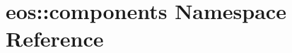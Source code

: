 \hypertarget{namespaceeos_1_1components}{
\section{eos::components Namespace Reference}
\label{namespaceeos_1_1components}
}
